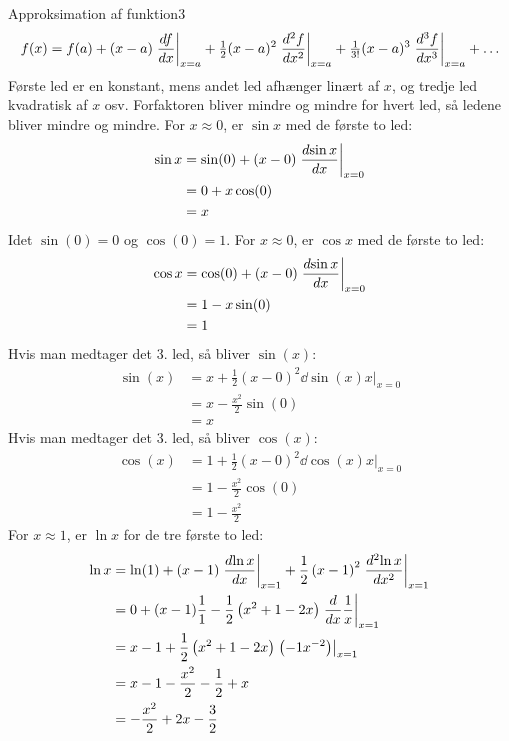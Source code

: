 \begin{opgave}{Approksimation af funktion}{3}
  \[
  f(x) = f(a) + (x-a) \left.{d{f} \over d{x}}\right|_{x=a}
  + \tfrac{1}{2} (x-a)^2 \left.{d^2{f} \over d{x}^2}\right|_{x=a}
  + \tfrac{1}{3!} (x-a)^3 \left.\frac{d^3f}{dx^3}\right|_{x=a}
  + \ldots
  \]
  \opg Første led er en konstant, mens andet led afhænger linært af $x$, og tredje led kvadratisk af $x$ osv. Forfaktoren bliver mindre og mindre for hvert led, så ledene bliver mindre og mindre.
  \opg For $x \approx 0$, er $\sin x$ med de første to led:
  \begin{align*}
  \sin x &= \sin(0) + (x-0) \left. {d{\sin x} \over d{x}}\right|_{x=0} \\
  &= 0 + x\cos(0) \\
  &= x
  \end{align*}
  Idet $\sin(0)=0$ og $\cos(0)=1$.
  For $x \approx 0$, er $\cos x$ med de første to led:
  \begin{align*}
  \cos x &= \cos(0) + (x-0) \left.{d{\sin x} \over d{x}}\right|_{x=0} \\
  &= 1 -x\sin(0) \\
  &= 1
  \end{align*}
  Hvis man medtager det 3. led, så bliver $\sin(x)$:
  \begin{align*}
  \sin(x) &= x + \frac{1}{2} (x-0)^2 \left. \dd{\sin(x)}{x}\right|_{x=0} \\
  &= x - \frac{x^2}{2} \sin(0) \\
  &= x  
  \end{align*}
  Hvis man medtager det 3. led, så bliver $\cos(x)$:
  \begin{align*}
  \cos(x) &= 1 + \frac{1}{2} (x-0)^2 \left.\dd{\cos(x)}{x}\right|_{x=0} \\
  &= 1 - \frac{x^2}{2} \cos(0) \\
  &= 1 - \frac{x^2}{2}  
  \end{align*}
  \opg For $x \approx 1$, er $\ln x$ for de tre første to led:
  \begin{align*}
  \ln x &= \ln(1) + (x-1) \left. \d{\ln x}{x} \right|_{x=1} + \frac{1}{2} \left(x-1\right)^2 \left. \dd{\ln x}{x}\right|_{x=1} \\
  &= 0 + (x-1)\frac{1}{1} - \frac{1}{2} \left( x^2 +1 - 2x \right) \left. \d{}{x} \frac{1}{x} \right|_{x=1} \\
  &= x -1 + \frac{1}{2} \left( x^2 + 1 - 2x \right) \left. \left( -1 x^{-2} \right)\right|_{x=1} \\
  &= x - 1 - \frac{x^2}{2} - \frac{1}{2} + x\\
  &= - \frac{x^2}{2} + 2x - \frac{3}{2}

\end{align*}
\end{opgave}
